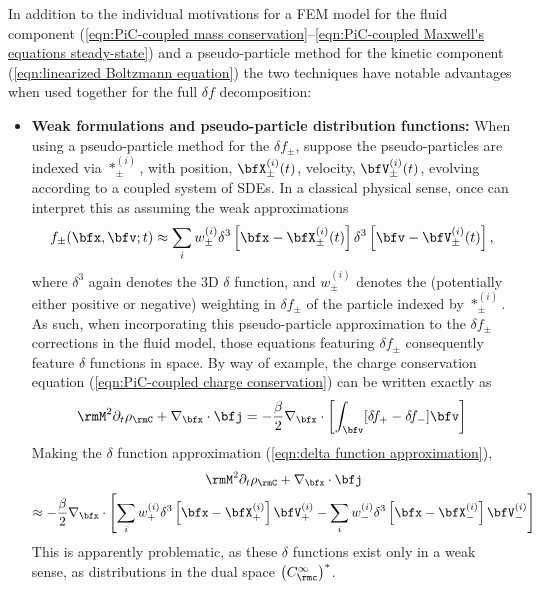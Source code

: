     In addition to the individual motivations for a FEM model for the fluid component (\ref{eqn:PiC-coupled mass conservation}--\ref{eqn:PiC-coupled Maxwell's equations steady-state}) and a pseudo-particle method for the kinetic component (\ref{eqn:linearized Boltzmann equation}) the two techniques have notable advantages when used together for the full $\delta\!f$ decomposition:
    \begin{itemize}
        \item  {\bf Weak formulations and pseudo-particle distribution functions:} When using a pseudo-particle method for the $\delta\!f_{\pm}$, suppose the pseudo-particles are indexed via $*_{\pm}^{(i)}$, with position, $\bfX_{\pm}^{(i)}(t)$, velocity, $\bfV_{\pm}^{(i)}(t)$, evolving according to a coupled system of SDEs. In a classical physical sense, once can interpret this as assuming the weak approximations
        \begin{equation}\label{eqn:delta function approximation}
            f_{\pm}(\bfx, \bfv; t)  \approx  \sum_{i}w_{\pm}^{(i)}\delta^{3}\left[\bfx - \bfX_{\pm}^{(i)}(t)\right]\delta^{3}\left[\bfv - \bfV_{\pm}^{(i)}(t)\right],
        \end{equation}
        where $\delta^{3}$ again denotes the 3D $\delta$ function, and $w_{\pm}^{(i)}$ denotes the (potentially either positive or negative) weighting in $\delta\!f_{\pm}$ of the particle indexed by $*_{\pm}^{(i)}$. As such, when incorporating this pseudo-particle approximation to the $\delta\!f_{\pm}$ corrections in the fluid model, those equations featuring $\delta\!f_{\pm}$ consequently feature $\delta$ functions in space. By way of example, the charge conservation equation (\ref{eqn:PiC-coupled charge conservation}) can be written exactly as
        \begin{equation}
            \rmM^{2}\partial_{t}\rho_{\rmC} + \nabla_{\bfx}\cdot\bfj  =  - \frac{\beta}{2}\nabla_{\bfx}\cdot\left[\int_{\bfv}[\delta\!f_{+} - \delta\!f_{-}]\bfv\right]
        \end{equation}
        Making the $\delta$ function approximation (\ref{eqn:delta function approximation}),
        \begin{multline}\label{eqn:PiC-coupled charge conservation with pseudo-particles}
            \rmM^{2}\partial_{t}\rho_{\rmC} + \nabla_{\bfx}\cdot\bfj  \\
            \approx  - \frac{\beta}{2}\nabla_{\bfx}\cdot\left[\sum_{i}w_{+}^{(i)}\delta^{3}\left[\bfx - \bfX_{+}^{(i)}\right]\bfV_{+}^{(i)} - \sum_{i}w_{-}^{(i)}\delta^{3}\left[\bfx - \bfX_{-}^{(i)}\right]\bfV_{-}^{(i)}\right]
        \end{multline}        
        This is apparently problematic, as these $\delta$ functions exist only in a weak sense, as distributions in the dual space $\left(C^{\infty}_{\rmc}\right)^{*}$.
        

\end{itemize}
